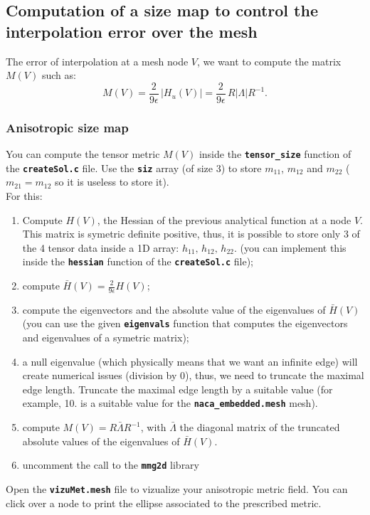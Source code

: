 \documentclass{article}
\newcommand{\ttb}[1]{\texttt{\textbf{#1}}}
\begin{document}
\subsection{Computation of a size map to control the interpolation error over the mesh}
The error of interpolation at a mesh node $V$, we want to compute
the matrix $M(V)$ such as:
$$
M(V) = \frac{2}{9\epsilon} \, \left | H_u(V) \right | = \frac{2}{9\epsilon} \, R
\left |\Lambda\right | R^{-1}.
$$

\subsubsection{Anisotropic size map}
You can compute the tensor metric $M(V)$ inside the \ttb{tensor\_size}
function of the \ttb{createSol.c} file. Use the \ttb{siz} array (of
size 3) to store $m_{11}$, $m_{12}$ and $m_{22}$ ($m_{21} = m_{12}$ so
it is useless to store it).\\

For this:

\begin{enumerate}
\item Compute $H(V)$, the Hessian of the previous analytical function
  at a node $V$. This matrix is symetric definite positive, thus, it
  is possible to store only 3 of the 4 tensor data inside a 1D array:
  $h_{11},\,h_{12},\,h_{22}$. (you can implement this
  inside the \ttb{hessian} function of the \ttb{createSol.c} file);
\item compute $\bar{H}(V) = \frac{2}{9\epsilon}H(V)$;
\item compute the eigenvectors and the absolute value of the
  eigenvalues of $\bar{H}(V)$ (you can use the given \ttb{eigenvals}
  function that computes the eigenvectors and eigenvalues of a
  symetric matrix);
\item a null eigenvalue (which physically means that we want an
  infinite edge) will create numerical issues (division by 0), thus, we
  need to truncate the maximal edge length. Truncate the maximal edge
  length by a suitable value (for example, 10. is a suitable value for
  the \ttb{naca\_embedded.mesh} mesh).
\item compute $M(V) = R \bar{\Lambda} R^{-1}$, with
  $\bar{\Lambda}$ the diagonal matrix of the truncated absolute values
  of the eigenvalues of $\bar{H}(V)$.
\item uncomment the call to the \ttb{mmg2d} library
\end{enumerate}

Open the \ttb{vizuMet.mesh} file to vizualize your anisotropic metric field.
You can click over a node to print the ellipse associated to the prescribed metric.\\
\end{document}

